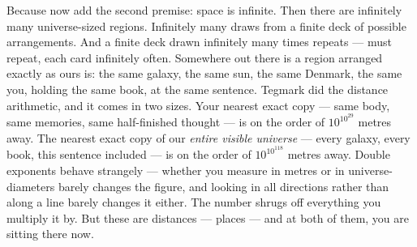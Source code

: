 \documentclass[fontsize=11pt,paper=a4,pagesize=auto,parskip=half-]{scrbook}
\begin{document}
Because now add the second premise: space is infinite. Then there are infinitely many universe-sized regions. Infinitely many draws from a finite deck of possible arrangements. And a finite deck drawn infinitely many times repeats --- must repeat, each card infinitely often. Somewhere out there is a region arranged exactly as ours is: the same galaxy, the same sun, the same Denmark, the same you, holding the same book, at the same sentence. Tegmark did the distance arithmetic, and it comes in two sizes. Your nearest exact copy --- same body, same memories, same half-finished thought --- is on the order of $10^{10^{29}}$ metres away. The nearest exact copy of our \emph{entire visible universe} --- every galaxy, every book, this sentence included --- is on the order of $10^{10^{118}}$ metres away. Double exponents behave strangely --- whether you measure in metres or in universe-diameters barely changes the figure, and looking in all directions rather than along a line barely changes it either. The number shrugs off everything you multiply it by. But these are distances --- places --- and at both of them, you are sitting there now.
\end{document}
